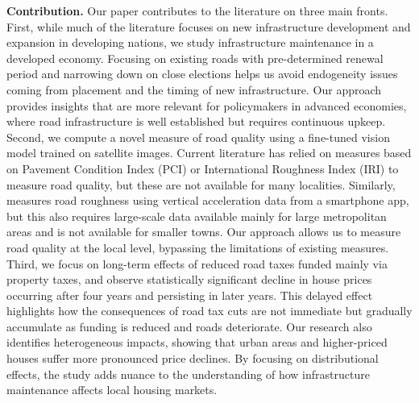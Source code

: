 {\bf Contribution.} Our paper contributes to the literature on three main fronts. 
First, while much of the literature focuses on new infrastructure development and expansion in developing nations, we study infrastructure maintenance in a developed economy. Focusing on existing roads with pre-determined renewal period and narrowing down on close elections helps us avoid endogeneity issues coming from placement and the timing of new infrastructure. Our approach provides insights that are more relevant for policymakers in advanced economies, where road infrastructure is well established but requires continuous upkeep. 
Second, we compute a novel measure of road quality using a fine-tuned vision model trained on satellite images. Current literature has relied on measures based on Pavement Condition Index (PCI) or International Roughness Index (IRI) to measure road quality, but these are not available for many localities. Similarly, \cite{currier2023} measures road roughness using vertical acceleration data from a smartphone app, but this also requires large-scale data available mainly for large metropolitan areas and is not available for smaller towns. Our approach allows us to measure road quality at the local level, bypassing the limitations of existing measures. 
Third, we focus on long-term effects of reduced road taxes funded mainly via property taxes, and observe statistically significant decline in house prices occurring after four years and persisting in later years. This delayed effect highlights how the consequences of road tax cuts are not immediate but gradually accumulate as funding is reduced and roads deteriorate. Our research also identifies heterogeneous impacts, showing that urban areas and higher-priced houses suffer more pronounced price declines. By focusing on distributional effects, the study adds nuance to the understanding of how infrastructure maintenance affects local housing markets.



